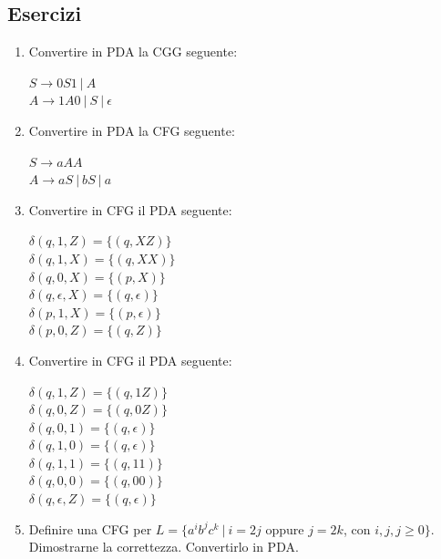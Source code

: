 \documentclass[a4paper,11pt]{article}
\begin{document}
\subsection{Esercizi}
\begin{enumerate}
    \item  Convertire in PDA la CGG seguente:\\
    \begin{minipage}{\linewidth}
       $S \rightarrow 0S1\ |\ A$\\
        $A \rightarrow 1A0\ |\ S\ |\ \epsilon$\\
   \end{minipage}
   \item  Convertire in PDA la CFG seguente:\\
   \begin{minipage}{\linewidth}
    $S \rightarrow aAA$\\
       $A \rightarrow aS\ |\ bS\ |\ a$\\
  \end{minipage}
   \item  Convertire in CFG il PDA seguente:\\
   \begin{minipage}{\linewidth}
       $ \delta (q,1,Z) = \{(q, XZ)\}$\\
       $ \delta (q,1,X) = \{(q, XX)\}$\\
       $ \delta (q,0,X) = \{(p, X)\}$\\
       $ \delta (q,\epsilon ,X) = \{(q, \epsilon )\}$\\
       $ \delta (p,1,X) = \{(p, \epsilon )\}$\\
       $ \delta (p,0,Z) = \{(q, Z)\}$\\
  \end{minipage}
  \item  Convertire in CFG il PDA seguente:\\
  \begin{minipage}{\linewidth}
      $ \delta (q,1,Z) = \{(q, 1Z)\}$\\
      $ \delta (q,0,Z) = \{(q, 0Z)\}$\\
      $ \delta (q,0,1) = \{(q, \epsilon)\}$\\
      $ \delta (q,1,0) = \{(q, \epsilon )\}$\\
      $ \delta (q,1,1) = \{(q, 11 )\}$\\
      $ \delta (q,0,0) = \{(q,00 )\}$\\
      $ \delta (q, \epsilon, Z) = \{(q, \epsilon)\}$\\
 \end{minipage}   
 \item Definire una CFG per $L=\{ a^ib^jc^k\ |\ i=2j $ oppure $j=2k$, con $i,j,j\geq 0\}$. Dimostrarne la correttezza. Convertirlo in PDA.
\end{enumerate}
\end{document}
